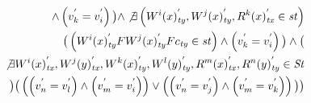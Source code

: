 \documentclass{sig-alternate-05-2015}
\begin{document}
\begin{align}
\begin{split}
   \wedge \left( v_k^{'} = v_i^{'} \right)  \big)  \wedge
   \not\exists \left( {W^i}(x)^{'}_\mathit{ty}, {W^j}(x)^{'}_\mathit{ty}, {R^k}(x)^{'}_\mathit{tx} \in  \mathit{st} \right) \\
    \big( \left(
 {W^i}(x)^{'}_\mathit{ty}  F {W^j}(x)^{'}_\mathit{ty} F  c_\mathit{ty} \in  \mathit{st} \right)
   \wedge \left( v_k^{'} = v_i^{'} \right)  \big) \wedge
  \big( \\ \not\exists {W^i}(x)^{'}_\mathit{tx},  {W^j}(y)^{'}_\mathit{tx},
  {W^k}(x)^{'}_\mathit{ty}, {W^l}(y)^{'}_\mathit{ty}, {R^m}(x)^{'}_\mathit{tx}, {R^n}(y)^{'}_\mathit{ty} \in \mathit{St} \\ \big)
\big( \left( \left( v_n^{'} = v_l^{'} \right) \wedge \left( v_m^{'} = v_i^{'} \right) \right) \vee \left( \left( v_n^{'} = v_j^{'} \right) \wedge \left( v_m^{'} = v_k^{'} \right) \right)  \big) \big) %

\end{split}
\end{align}
\end{document}
